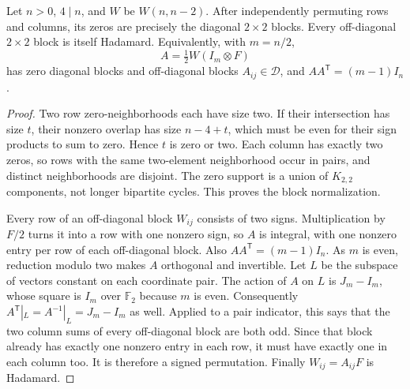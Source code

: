 \begin{theorem}
Let $n>0$, $4\mid n$, and $W$ be $W(n,n-2)$. After independently permuting
rows and columns, its zeros are precisely the diagonal $2\times2$
blocks. Every off-diagonal $2\times2$ block is itself Hadamard.
Equivalently, with $m=n/2$,
\[
 A=\tfrac12W(I_m\otimes F)
\]
has zero diagonal blocks and off-diagonal blocks $A_{ij}\in\mathcal D$,
and $AA^{\mathsf T}=(m-1)I_n$.
\end{theorem}
\begin{proof}
Two row zero-neighborhoods each have size two. If their intersection
has size $t$, their nonzero overlap has size $n-4+t$, which must be
even for their sign products to sum to zero. Hence $t$ is zero or
two. Each column has exactly two zeros, so rows with the same
two-element neighborhood occur in pairs, and distinct neighborhoods
are disjoint. The zero support is a union of $K_{2,2}$ components,
not longer bipartite cycles. This proves the block normalization.

Every row of an off-diagonal block $W_{ij}$ consists of two signs.
Multiplication by $F/2$ turns it into a row with one nonzero sign,
so $A$ is integral, with one nonzero entry per row of each
off-diagonal block. Also $AA^{\mathsf T}=(m-1)I_n$.
As $m$ is even, reduction modulo two makes $A$ orthogonal and
invertible. Let $L$ be the subspace of vectors constant on each
coordinate pair. The action of $A$ on $L$ is $J_m-I_m$, whose
square is $I_m$ over $\mathbb F_2$ because $m$ is even.
Consequently $A^{\mathsf T}|_L=A^{-1}|_L=J_m-I_m$ as well.
Applied to a pair indicator, this says that the two column sums
of every off-diagonal block are both odd. Since that block already
has exactly one nonzero entry in each row, it must have exactly
one in each column too. It is therefore a signed permutation.
Finally $W_{ij}=A_{ij}F$ is Hadamard.
\end{proof}

